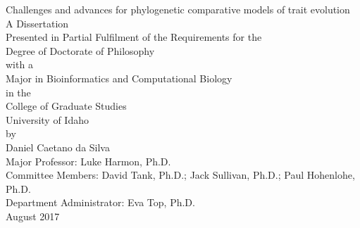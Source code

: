 \pagestyle{myheadings}

\thispagestyle{empty}

\begin{center}
\vspace*{\fill}
Challenges and advances for phylogenetic comparative models of trait evolution\\
\vspace{48pt}
A Dissertation\\
Presented in Partial Fulfilment of the Requirements for the\\
Degree of Doctorate of Philosophy\\
with a\\
Major in Bioinformatics and Computational Biology\\
in the\\
College of Graduate Studies\\
University of Idaho\\
by\\
Daniel Caetano da Silva\\
\vspace{60pt}
Major Professor: Luke Harmon, Ph.D.\\
Committee Members: David Tank, Ph.D.; Jack Sullivan, Ph.D.; Paul Hohenlohe, Ph.D.\\
Department Administrator: Eva Top, Ph.D.\\
\vspace{80pt}
August 2017\\
\vspace*{\fill}
\end{center}
\pagebreak

